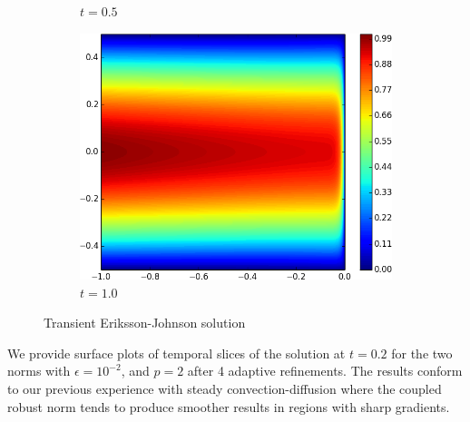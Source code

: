 \documentclass[Dissertation.tex]{subfiles}
\begin{document}
\begin{figure}[ht]
\begin{subfigure}[t]{0.32\textwidth}
\caption{$t=0.5$}
\end{subfigure}
\begin{subfigure}[t]{0.32\textwidth}
\centering
\includegraphics[width=\textwidth]{Confusion/Robustness/2d_problem_t_=_10.png}
\caption{$t=1.0$}
\end{subfigure}
\caption{Transient Eriksson-Johnson solution}
\label{fig:transientAnalytical}
\end{figure}

We provide surface plots of temporal slices of the solution at $t=0.2$ for the two norms with $\epsilon=10^{-2}$, 
and $p=2$ after 4 adaptive refinements.
The results conform to our previous experience with steady convection-diffusion where the coupled robust norm 
tends to produce smoother results in regions with sharp gradients.
\end{document}
